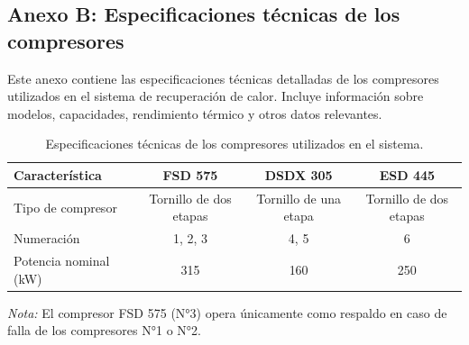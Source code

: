 \documentclass[11pt,a4paper]{article}  %
\begin{document}
\subsection{Anexo B: Especificaciones técnicas de los compresores}
Este anexo contiene las especificaciones técnicas detalladas de los compresores utilizados en el sistema de recuperación de calor. Incluye información sobre modelos, capacidades, rendimiento térmico y otros datos relevantes.

\begin{table}[h]
\footnotesize
\centering
\begin{tabular}{lccc}
\toprule
Característica & FSD 575 & DSDX 305 & ESD 445 \\
\midrule
Tipo de compresor & Tornillo de dos etapas & Tornillo de una etapa & Tornillo de dos etapas \\
Numeración & 1, 2, 3 & 4, 5 & 6 \\
Potencia nominal (kW) & 315 & 160 & 250 \\
\bottomrule
\end{tabular}
\caption{Especificaciones técnicas de los compresores utilizados en el sistema.}
\label{tab:especificaciones_compresores_ampliadas}
\footnotesize
\textit{Nota:} El compresor FSD 575 (N°3) opera únicamente como respaldo en caso de falla de los compresores N°1 o N°2.
\end{table}
\end{document}
